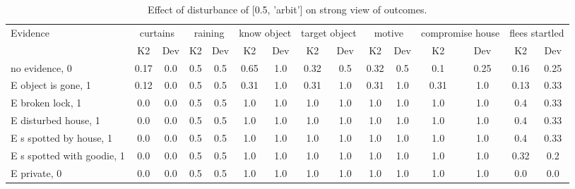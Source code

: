 \begin{table}\begin{tabular}{l|cc|cc|cc|cc|cc|cc|cc}\toprule\multirow{2}{*}{Evidence} & \multicolumn{2}{c}{curtains}& \multicolumn{2}{c}{raining}& \multicolumn{2}{c}{know object}& \multicolumn{2}{c}{target object}& \multicolumn{2}{c}{motive}& \multicolumn{2}{c}{compromise house}& \multicolumn{2}{c}{flees startled}\\& {K2} & {Dev}& {K2} & {Dev}& {K2} & {Dev}& {K2} & {Dev}& {K2} & {Dev}& {K2} & {Dev}& {K2} & {Dev}\\\midrule
no evidence, 0 & \cellcolor{Bittersweet}0.17&\cellcolor{Bittersweet}0.0&0.5&0.5&\cellcolor{Bittersweet}0.65&\cellcolor{Bittersweet}1.0&\cellcolor{Bittersweet}0.32&\cellcolor{Bittersweet}0.5&\cellcolor{Bittersweet}0.32&\cellcolor{Bittersweet}0.5&\cellcolor{Bittersweet}0.1&\cellcolor{Bittersweet}0.25&\cellcolor{Bittersweet}0.16&\cellcolor{Bittersweet}0.25\\E object is gone, 1 & \cellcolor{Bittersweet}0.12&\cellcolor{Bittersweet}0.0&0.5&0.5&\cellcolor{Bittersweet}0.31&\cellcolor{Bittersweet}1.0&\cellcolor{Bittersweet}0.31&\cellcolor{Bittersweet}1.0&\cellcolor{Bittersweet}0.31&\cellcolor{Bittersweet}1.0&\cellcolor{Bittersweet}0.31&\cellcolor{Bittersweet}1.0&\cellcolor{Bittersweet}0.13&\cellcolor{Bittersweet}0.33\\E broken lock, 1 & 0.0&0.0&0.5&0.5&1.0&1.0&1.0&1.0&1.0&1.0&1.0&1.0&\cellcolor{Bittersweet}0.4&\cellcolor{Bittersweet}0.33\\E disturbed house, 1 & 0.0&0.0&0.5&0.5&1.0&1.0&1.0&1.0&1.0&1.0&1.0&1.0&\cellcolor{Bittersweet}0.4&\cellcolor{Bittersweet}0.33\\E s spotted by house, 1 & 0.0&0.0&0.5&0.5&1.0&1.0&1.0&1.0&1.0&1.0&1.0&1.0&\cellcolor{Bittersweet}0.4&\cellcolor{Bittersweet}0.33\\E s spotted with goodie, 1 & 0.0&0.0&0.5&0.5&1.0&1.0&1.0&1.0&1.0&1.0&1.0&1.0&\cellcolor{Bittersweet}0.32&\cellcolor{Bittersweet}0.2\\E private, 0 & 0.0&0.0&0.5&0.5&1.0&1.0&1.0&1.0&1.0&1.0&1.0&1.0&0.0&0.0\\\bottomrule\end{tabular}\caption{Effect of disturbance of [0.5, 'arbit'] on strong view of outcomes.}\end{table}